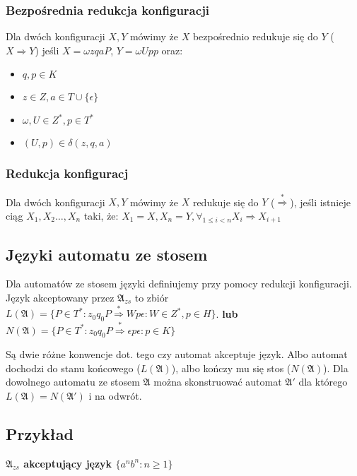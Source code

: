 \documentclass{../notatki}
\begin{document}
\subsubsection{Bezpośrednia redukcja konfiguracji}

Dla dwóch konfiguracji $X, Y$ mówimy że $X$ bezpośrednio redukuje się do $Y$
($X \Rightarrow Y$) jeśli $X=\omega zqaP$, $Y=\omega Upp$ oraz:

\begin{itemize}
  \item $q,p \in K$
  \item $z \in Z, a \in T \cup \{\epsilon\}$
  \item $\omega, U \in Z^*, p \in T^*$
  \item $(U, p) \in \delta(z, q, a)$
\end{itemize}

\subsubsection{Redukcja konfiguracj}

Dla dwóch konfiguracji $X, Y$ mówimy że $X$ redukuje się do $Y$
($\stackrel{*}{\Rightarrow}$), jeśli istnieje ciąg $X_1,X_2\dots, X_n$ taki, że:
$X_1 = X, X_n = Y, \forall_{1 \le i < n}X_i \Rightarrow X_{i + 1}$

\subsection{Języki automatu ze stosem}

Dla automatów ze stosem języki definiujemy przy pomocy redukcji konfiguracji.
Język akceptowany przez $\mathfrak{A}_{zs}$ to zbiór
$L(\mathfrak{A})=\{P \in T^* : z_0q_0P \stackrel{*}{\Rightarrow}
Wp\epsilon : W \in Z^*, p \in H\}$.
\textbf{lub} $N(\mathfrak{A})=\{P \in T^* : z_0q_0P
\stackrel{*}{\Rightarrow} \epsilon p \epsilon : p \in K\}$

Są dwie różne konwencje dot. tego czy automat akceptuje język. Albo automat
dochodzi do stanu końcowego ($L(\mathfrak{A})$), albo kończy mu się
stos ($N(\mathfrak{A})$). Dla dowolnego automatu ze stosem $\mathfrak{A}$ można
skonstruować automat $\mathfrak{A}'$ dla którego
$L(\mathfrak{A})=N(\mathfrak{A}')$ i na odwrót.

\subsection{Przykład}

\textbf{$\mathfrak{A}_{zs}$ akceptujący język $\{a^nb^n : n \ge 1\}$}
\end{document}
